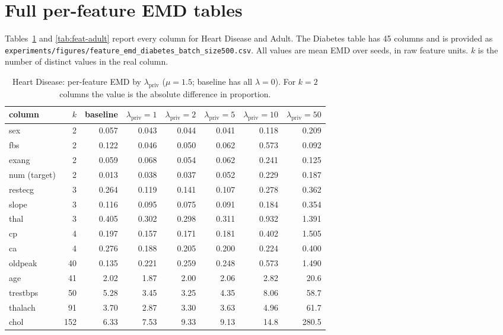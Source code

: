\documentclass[11pt,a4paper]{article}
\newcommand{\lpriv}{\lambda_{\text{priv}}}
\begin{document}
\section{Full per-feature EMD tables}
\label{app:features}

Tables~\ref{tab:feat-heart} and \ref{tab:feat-adult} report every column for
Heart Disease and Adult. The Diabetes table has 45 columns and is provided as
\texttt{experiments/figures/feature\_emd\_diabetes\_batch\_size500.csv}. All
values are mean EMD over seeds, in raw feature units. $k$ is the number of
distinct values in the real column.

\begin{table}[htbp]
\caption{Heart Disease: per-feature EMD by $\lpriv$ ($\mu = 1.5$; baseline
has all $\lambda = 0$). For $k=2$ columns the value is the absolute difference
in proportion.}
\label{tab:feat-heart}
\centering\small
\begin{adjustbox}{max width=\textwidth}
\begin{tabular}{@{}lrrrrrrr@{}}
\toprule
column & $k$ & baseline & $\lpriv{=}1$ & $\lpriv{=}2$ & $\lpriv{=}5$ & $\lpriv{=}10$ & $\lpriv{=}50$ \\
\midrule
sex      & 2   & 0.057 & 0.043 & 0.044 & 0.041 & 0.118 & 0.209 \\
fbs      & 2   & 0.122 & 0.046 & 0.050 & 0.062 & 0.573 & 0.092 \\
exang    & 2   & 0.059 & 0.068 & 0.054 & 0.062 & 0.241 & 0.125 \\
num (target) & 2 & 0.013 & 0.038 & 0.037 & 0.052 & 0.229 & 0.187 \\
restecg  & 3   & 0.264 & 0.119 & 0.141 & 0.107 & 0.278 & 0.362 \\
slope    & 3   & 0.116 & 0.095 & 0.075 & 0.091 & 0.184 & 0.354 \\
thal     & 3   & 0.405 & 0.302 & 0.298 & 0.311 & 0.932 & 1.391 \\
cp       & 4   & 0.197 & 0.157 & 0.171 & 0.181 & 0.402 & 1.505 \\
ca       & 4   & 0.276 & 0.188 & 0.205 & 0.200 & 0.224 & 0.400 \\
oldpeak  & 40  & 0.135 & 0.221 & 0.259 & 0.248 & 0.573 & 1.490 \\
age      & 41  & 2.02  & 1.87  & 2.00  & 2.06  & 2.82  & 20.6 \\
trestbps & 50  & 5.28  & 3.45  & 3.25  & 4.35  & 8.06  & 58.7 \\
thalach  & 91  & 3.70  & 2.87  & 3.30  & 3.63  & 4.96  & 61.7 \\
chol     & 152 & 6.33  & 7.53  & 9.33  & 9.13  & 14.8  & 280.5 \\
\bottomrule
\end{tabular}
\end{adjustbox}
\end{table}
\end{document}
